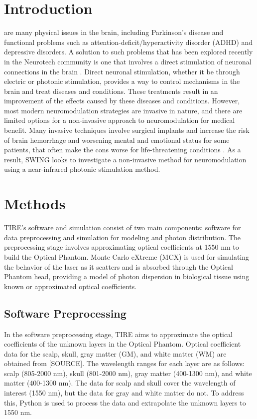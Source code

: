 \documentclass[journal,twoside,web]{ieeecolor}
\begin{document}
\section{Introduction}
\label{sec:introduction}
 are many physical issues in the brain, including Parkinson's disease and functional problems such as attention-deficit/hyperactivity disorder (ADHD)  
and depressive disorders. A solution to such problems that has been explored recently in the Neurotech community is one that involves a direct stimulation of  
neuronal connections in the brain \cite{b1,b2}. Direct neuronal stimulation, whether it be through electric or photonic stimulation, provides a way to control  
mechanisms in the brain and treat diseases and conditions. These treatments result in an improvement of the effects caused by these diseases and conditions.  
However, most modern neuromodulation strategies are invasive in nature, and there are limited options for a non-invasive approach to neuromodulation for medical benefit.  
Many invasive techniques involve surgical implants and increase the risk of brain hemorrhage and worsening mental and emotional status for some patients,  
that often make the cons worse for life-threatening conditions \cite{b1,b3}. As a result, SWING looks to investigate a non-invasive method for neuromodulation  
using a near-infrared photonic stimulation method. 

\section{Methods}
\label{sec:methods}
TIRE's software and simulation consist of two main components: software for data preprocessing and simulation for modeling and photon distribution. 
The preprocessing stage involves approximating optical coefficients at 1550 nm to build the Optical Phantom. Monte Carlo eXtreme (MCX) is used for simulating the 
behavior of the laser as it scatters and is absorbed through the Optical Phantom head, providing a model of photon dispersion in biological tissue using known or 
approximated optical coefficients.

\subsection{Software Preprocessing}
In the software preprocessing stage, TIRE aims to approximate the optical coefficients of the unknown layers in the Optical Phantom. Optical coefficient data for 
the scalp, skull, gray matter (GM), and white matter (WM) are obtained from [SOURCE]. The wavelength ranges for each layer are as follows: scalp (805-2000 nm), 
skull (801-2000 nm), gray matter (400-1300 nm), and white matter (400-1300 nm). The data for scalp and skull cover the wavelength of interest (1550 nm), but the data 
for gray and white matter do not. To address this, Python is used to process the data and extrapolate the unknown layers to 1550 nm.
\end{document}
